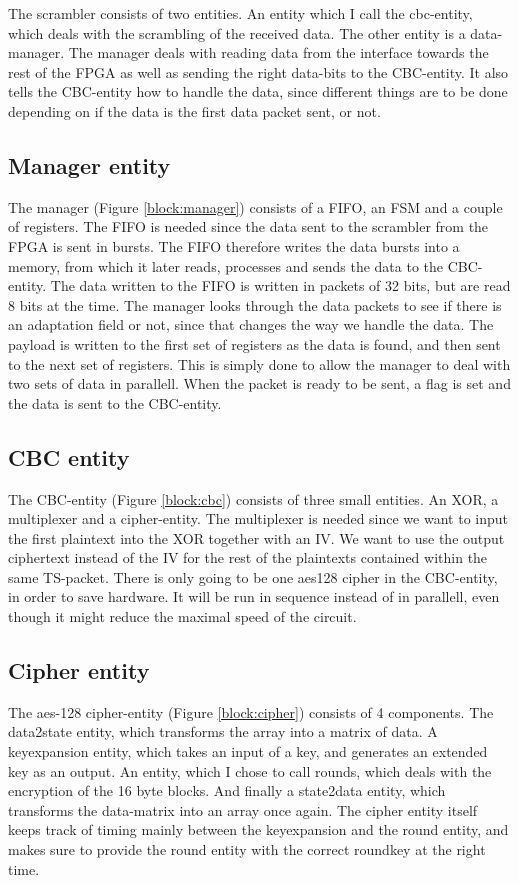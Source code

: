 The scrambler consists of two entities. An entity which I call the 
cbc-entity, which deals with the scrambling of the received data. The 
other entity is a data-manager. The manager deals with reading data 
from the interface towards the rest of the FPGA as well as sending the 
right data-bits to the CBC-entity. It also tells the CBC-entity how to 
handle the data, since different things are to be done depending on if 
the data is the first data packet sent, or not.

\subsection{Manager entity}
The manager (Figure \ref{block:manager}) consists of a FIFO, an FSM and 
a couple of registers. The FIFO is needed since the data sent to the 
scrambler from the FPGA is sent in bursts. The FIFO therefore writes 
the data bursts into a memory, from which it later reads, processes and 
sends the data to the CBC-entity. The data written to the FIFO is 
written in packets of 32 bits, but are read 8 bits at the time. The 
manager looks through the data packets to see if there is an adaptation 
field or not, since that changes the way we handle the data. The 
payload is written to the first set of registers as the data is found, 
and then sent to the next set of registers. This is simply done to 
allow the manager to deal with two sets of data in parallell. When the 
packet is ready to be sent, a flag is set and the data is sent to the 
CBC-entity. 

\subsection{CBC entity}
The CBC-entity (Figure \ref{block:cbc}) consists of three small 
entities. An XOR, a multiplexer and a cipher-entity. The multiplexer is 
needed since we want to input the first plaintext into the XOR together 
with an IV. We want to use the output ciphertext instead of the IV for 
the rest of the plaintexts contained within the same TS-packet. There 
is only going to be one aes128 cipher in the CBC-entity, in order to 
save hardware. It will be run in sequence instead of in parallell, even 
though it might reduce the maximal speed of the circuit.

\subsection{Cipher entity}
The aes-128 cipher-entity (Figure \ref{block:cipher}) consists of 4 
components. The data2state entity, which transforms the array into a 
matrix of data. A keyexpansion entity, which takes an input of a key, 
and generates an extended key as an output. An entity, which I chose to 
call rounds, which deals with the encryption of the 16 byte blocks. And 
finally a state2data entity, which transforms the data-matrix into an 
array once again. The cipher entity itself keeps track of timing mainly 
between the keyexpansion and the round entity, and makes sure to 
provide the round entity with the correct roundkey at the right time.

